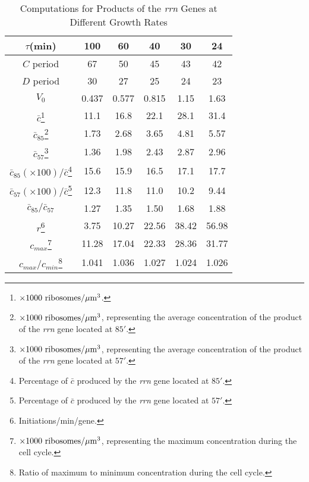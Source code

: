 \begin{table}[bh]
\centering
\begin{minipage}{3.7in}
\caption{Computations for Products of the {\em rrn} Genes at Different
Growth Rates\label{tab2}}
\begin{tabular}{|c||c|c|c|c|c||}	 \hline
 $\tau$(min)  &  100  &	60 & 40 & 30 & 24 \\ \hline \hline
 $C$ period & 67 & 50  & 45 & 43 & 42 \\ \hline
 $D$ period & 30 & 27  & 25 & 24 & 23 \\ \hline
 $V_0$ & 0.437 & 0.577 & 0.815 & 1.15 & 1.63 \\ \hline
 $\bar c$\footnote{$\times 1000\ {\rm ribosomes}/\mu{\rm m}^3$.}
 & 11.1 & 16.8 & 22.1 & 28.1 & 31.4 \\ \hline
$\bar c_{85}$\footnote{$\times 1000\ {\rm ribosomes}/\mu{\rm m}^3$,
representing the average concentration of the product of the {\em rrn} gene
located at $85'$.} & 1.73 & 2.68 & 3.65 & 4.81 & 5.57 \\ \hline
$\bar c_{57}$\footnote{$\times 1000\ {\rm ribosomes}/\mu{\rm m}^3$,
representing the average concentration of the product of the {\em rrn} gene
located at $57'$.} & 1.36 & 1.98 & 2.43 & 2.87 & 2.96 \\ \hline
$\bar c_{85}({\scriptstyle\times 100})/\bar c$\footnote{Percentage of
$\bar c$ produced by the {\em rrn} gene located at $85'$.} & 15.6 & 15.9 &
16.5 & 17.1 & 17.7 \\ \hline
$\bar c_{57}({\scriptstyle\times 100})/\bar c$\footnote{Percentage of
$\bar c$ produced by the {\em rrn} gene located at $57'$.} & 12.3 & 11.8 &
11.0 & 10.2 & 9.44 \\ \hline
$\bar c_{85}/\bar c_{57}$ & 1.27 & 1.35 & 1.50 & 1.68 & 1.88 \\ \hline
 $r$\footnote{Initiations/min/gene.} & 3.75 & 10.27
  & 22.56 & 38.42 & 56.98 \\ \hline
$c_{max}$\footnote{$\times 1000\ {\rm ribosomes}/\mu{\rm m}^3$, representing
the maximum concentration during the cell cycle.} & 11.28 & 17.04
  & 22.33 & 28.36 & 31.77 \\ \hline
$c_{max}/c_{min}$\footnote{Ratio of maximum to minimum concentration
 during the cell cycle.} & 1.041 & 1.036 & 1.027 & 1.024 & 1.026 \\ \hline
\end{tabular}
\end{minipage}
\end{table}

